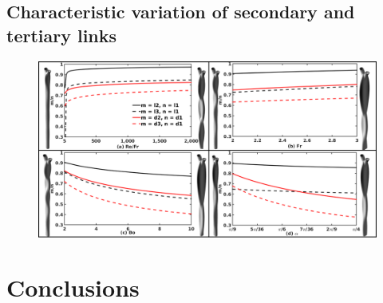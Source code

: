 \documentclass[%
aip,
sd,%
amsmath,amssymb,
preprint,%
author-year,%
]{revtex4-1}
\begin{document}
\subsection{Characteristic variation of secondary and tertiary links}
\lipsum[1]
\begin{figure}
	\centering
	\includegraphics[width=\linewidth]{lil1did1}
	\caption{}
	\label{Figure::lil1}
\end{figure}
\lipsum
\section{Conclusions}
\lipsum[1]
\nocite{*}

\end{document}
